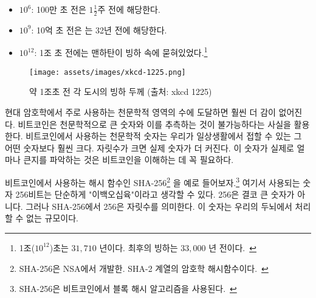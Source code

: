 \begin{itemize}
	\item $10^6$: 100만 초 전은 $1 \frac{1}{2}$주 전에 해당한다.
	\item $10^9$: 10억 초 전은 는 32년 전에 해당한다.
	\item $10^{12}$: 1조 초 전에는 맨하탄이 빙하 속에 묻혀있었다.\footnote{1조($10^{12}$)초는 $31,710$ 년이다. 최후의 빙하는 $33,000$ 년 전이다.~\cite{wiki:LGM}}
\end{itemize}

\begin{figure}
	\texttt{[image: assets/images/xkcd-1225.png]}
	\caption{약 1조초 전 각 도시의 빙하 두께 (출처: xkcd 1225)}
	\label{fig:xkcd-1225}
\end{figure}

\begin{comment}
	As soon as we enter the beyond-astronomical realm of modern
	cryptography, our intuition fails catastrophically. Bitcoin is built
	around large numbers and the virtual impossibility of guessing them.
	These numbers are way, way larger than anything we might encounter in
	day-to-day life. Many orders of magnitude larger. Understanding how
	large these numbers truly are is essential to understanding Bitcoin as a
	whole.
\end{comment}
현대 암호학에서 주로 사용하는 천문학적 영역의 수에 도달하면 훨씬 더 감이 없어진다.
비트코인은 천문학적으로 큰 숫자와 이를 추측하는 것이 불가능하다는 사실을 활용한다.
비트코인에서 사용하는 천문학적 숫자는 우리가 일상생활에서 접할 수 있는 그 어떤 숫자보다 훨씬 크다. 자릿수가 크면 실제 숫자가 더 커진다.
이 숫자가 실제로 얼마나 큰지를 파악하는 것은 비트코인을 이해하는 데 꼭 필요하다.

\begin{comment}
	Let's take SHA-256\footnote{SHA-256 is part of the SHA-2 family of cryptographic
		hash functions developed by the NSA.~\cite{wiki:sha2}}, one of the hash
	functions\footnote{Bitcoin uses SHA-256 in its block hashing
		algorithm.~\cite{btcwiki:block-hashing}} used in Bitcoin, as a concrete example.
	It is only natural to think about 256 bits as \enquote{two hundred fifty-six,} which
	isn't a large number at all. However, the number in SHA-256 is talking about
	orders of magnitude --- something our brains are not well-equipped to deal with.
\end{comment}
비트코인에서 사용하는 해시 함수인 SHA-256\footnote{SHA-256은 NSA에서 개발한. SHA-2 계열의  암호학 해시함수이다.~\cite{wiki:sha2}}
을 예로 들어보자.\footnote{SHA-256은 비트코인에서 블록 해시 알고리즘을 사용된다.~\cite{btcwiki:block-hashing}} 
여기서 사용되는 숫자 256비트는 단순하게 "이백오십육"이라고 생각할 수 있다. 256은 결코 큰 숫자가 아니다.
그러나 SHA-256에서 256은 자릿수를 의미한다. 
이 숫자는 우리의 두뇌에서 처리할 수 없는 규모이다.

